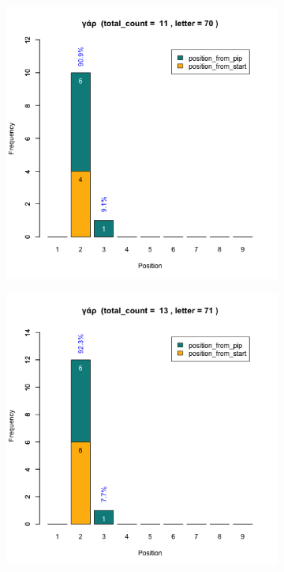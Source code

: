 \documentclass[a4paper]{article}
\begin{document}
\begin{figure}
\begin{subfigure}{0.45\textwidth}
\end{subfigure}
\begin{subfigure}{0.45\textwidth}
\centering
\includegraphics[width=1\linewidth]{../../data/output/paul_R_par/plots/par1_lt70.png}
\end{subfigure}
\begin{subfigure}{0.45\textwidth}
\centering
\includegraphics[width=1\linewidth]{../../data/output/paul_R_par/plots/par1_lt71.png}
\end{subfigure}
\end{figure}
\end{document}

